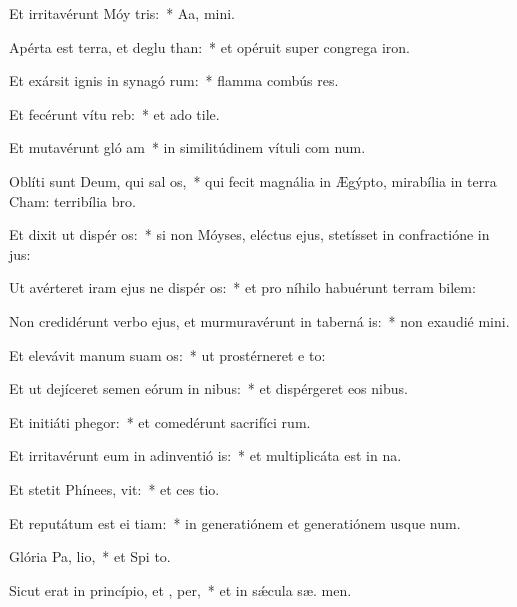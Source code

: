 \item Et irritavérunt Móy  tris:~* Aa,  mini.
\item Apérta est terra, et deglu than:~* et opéruit super congrega iron.
\item Et exársit ignis in synagó rum:~* flamma combús res.
\item Et fecérunt vítu  reb:~* et ado tile.
\item Et mutavérunt gló am~* in similitúdinem vítuli com num.
\item Oblíti sunt Deum, qui sal os,~* qui fecit magnália in Ægýpto, mirabília in terra Cham: terribília   bro.
\item Et dixit ut dispér os:~* si non Móyses, eléctus ejus, stetísset in confractióne in  jus:
\item Ut avérteret iram ejus ne dispér os:~* et pro níhilo habuérunt terram bilem:
\item Non credidérunt verbo ejus, et murmuravérunt in taberná is:~* non exaudié  mini.
\item Et elevávit manum suam  os:~* ut prostérneret e  to:
\item Et ut dejíceret semen eórum in nibus:~* et dispérgeret eos  nibus.
\item Et initiáti  phegor:~* et comedérunt sacrifíci rum.
\item Et irritavérunt eum in adinventió is:~* et multiplicáta est in  na.
\item Et stetit Phínees,  vit:~* et ces tio.
\item Et reputátum est ei  tiam:~* in generatiónem et generatiónem usque  num.
\item Glória Pa,  lio,~* et Spi to.
\item Sicut erat in princípio, et ,  per,~* et in sǽcula sæ. men.
